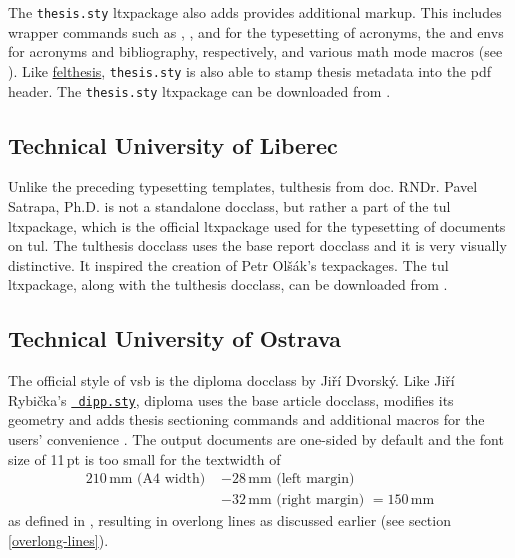 \documentclass[12pt,twoside,cover,color,table]%
  {fithesis3/fithesis3/fithesis3} %
\begin{document}
  The \texttt{thesis.sty} \gls{ltxpackage} also adds provides
  additional markup. This includes wrapper commands such as
  , ,  and  for
  the typesetting of acronyms, the  and
   \glspl{env} for acronyms and bibliography,
  respectively, and various math mode macros (see
  \cite[p.~6--9]{thesis.sty-doc}). Like
  \hyperref[sec:felthesis]{felthesis}, \texttt{thesis.sty} is also
  able to stamp thesis metadata into the \gls{pdf} header. The
  \texttt{thesis.sty} \gls{ltxpackage} can be downloaded from
  \cite{thesis.sty}.

  \subsection{Technical University of Liberec}
  Unlike the preceding typesetting templates, tulthesis from doc.
  RNDr. Pavel Satrapa, Ph.D. is not a standalone \gls{docclass},
  but rather a part of the tul \gls{ltxpackage}, which is the
  official \gls{ltxpackage} used for the typesetting of documents
  on \gls{tul}. The tulthesis \gls{docclass} uses the base report
  \gls{docclass} \cite[section~1]{tulthesis-man} and it is very
  visually distinctive. It inspired \cite[post~21]{ctustyle-forums}
  the creation of Petr Olšák's 
  \glspl{texpackage}. The tul \gls{ltxpackage}, along with the
  tulthesis \gls{docclass}, can be downloaded from \cite{tul}.

  \subsection{Technical University of Ostrava}
  The official style of \gls{vsb} is the diploma \gls{docclass} by
  Jiří Dvorský. Like Jiří Rybička's \hyperref[sec:dipp.sty]{\tt
  dipp.sty}, diploma uses the base article \gls{docclass}, modifies
  its geometry and adds thesis sectioning commands and additional
  macros for the users' convenience \cite{diploma}. The output
  documents are one-sided by default and the font size of 11\,pt is
  too small for the \gls{textwidth} of \begin{equation}
    \begin{split}
      210\,\text{mm} \text{ (A4 width) }
        &- 28\,\text{mm} \text{ (left margin) }  \\
        &- 32\,\text{mm} \text{ (right margin) } = 150\,\text{mm}
    \end{split}
  \end{equation} as defined in
  \cite[lines~111,~123]{diplomaSource}, resulting in overlong lines
  as discussed earlier (see section \ref{overlong-lines}).
\end{document}
